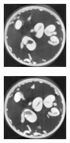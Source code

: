 \documentclass[journal]{IEEEtran}
\begin{document}
\begin{figure}[!h]
    \begin{subfigure}[b]{0.3\linewidth}
        \includegraphics[width=\textwidth]{../images/sprouts/template_1.png}
\captionsetup{labelformat=empty}
        \caption{}
    \end{subfigure}
\quad
    \begin{subfigure}[b]{0.3\linewidth}
        \includegraphics[width=\textwidth]{../images/sprouts/template_2.png}

\end{subfigure}
\end{figure}
\end{document}
